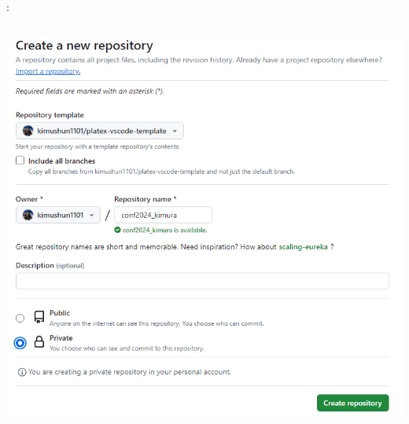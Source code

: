 \documentclass[aspectratio=169,dvipdfmx,cjk]{beamer}
\begin{document}
\begin{frame}[label=create-repo]{\insertsection \thesubsection: \insertsubsection}
\begin{columns}
\begin{column}{0.28\textwidth}
      \includegraphics[width=1.0\linewidth]{fig/create-repo.png}
    \end{column}
  \end{columns}
\end{frame}
\end{document}
